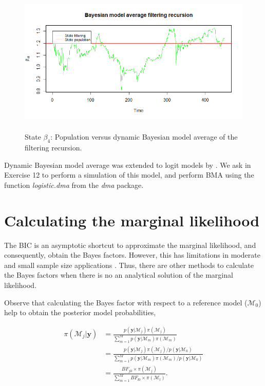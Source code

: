 \begin{figure}[!h]
	\includegraphics[width=340pt, height=200pt]{Chapters/chapter10/figures/figPMPdbma4.png}
	\caption[List of figure caption goes here]{State $\beta_{4}$: Population versus dynamic Bayesian model average of the filtering recursion.}\label{figPMPdbma4}
\end{figure}

Dynamic Bayesian model average was extended to logit models by \cite{mccormick2012dynamic}. We ask in Exercise 12 to perform a simulation of this model, and perform BMA using the function \textit{logistic.dma} from the \textit{dma} package.

\section{Calculating the marginal likelihood}\label{sec10_4}

The BIC is an asymptotic shortcut to approximate the marginal likelihood, and consequently, obtain the Bayes factors. However, this has limitations in moderate and small sample size applications \cite{gelfand1994bayesian}. Thus, there are other methods to calculate the Bayes factors when there is no an analytical solution of the marginal likelihood.

Observe that calculating the Bayes factor with respect to a reference model ($\mathcal{M}_0$) help to obtain the posterior model probabilities,

\begin{align*}
	\pi(\mathcal{M}_j |\bm{y})&=\frac{p(\bm{y} | \mathcal{M}_j)\pi(\mathcal{M}_j)}{\sum_{m=1}^{M}p(\bm{y} | \mathcal{M}_m)\pi(\mathcal{M}_m)}\\
	&=\frac{p(\bm{y} | \mathcal{M}_j)\pi(\mathcal{M}_j)/p(\bm{y} | \mathcal{M}_0)}{\sum_{m=1}^{M}p(\bm{y} | \mathcal{M}_m)\pi(\mathcal{M}_m)/p(\bm{y} | \mathcal{M}_0)}\\
	&=\frac{BF_{j0}\times\pi(\mathcal{M}_j)}{\sum_{m=1}^{M}BF_{l0}\times\pi(\mathcal{M}_l)}.
\end{align*}

